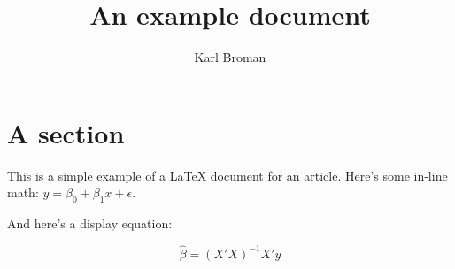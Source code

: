 \documentclass[12pt]{article}
\title{An example document}
\author{Karl Broman}
\begin{document}
\maketitle
\thispagestyle{empty} %

\section{A section}

This is a simple example of a \LaTeX\/ document for an article.
Here's some in-line math: $y = \beta_0 + \beta_1 x + \epsilon$.

And here's a display equation:

$$ \hat{\beta} = (X'X)^{-1} X'y $$
\end{document}
